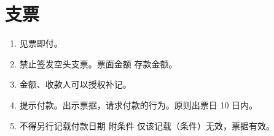 \section{支票}
\begin{enumerate}
  \item 见票即付。
  \item 禁止签发空头支票。票面金额 \dy 存款金额。
  \item 金额、收款人可以授权补记。
  \item 提示付款。出示票据，请求付款的行为。原则出票日 10 日内。
  \item 不得另行记载付款日期 \yjt 附条件 \yjt 仅该记载（条件）无效，票据有效。
\end{enumerate}
